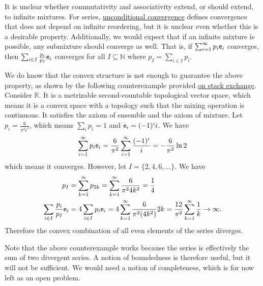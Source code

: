 It is unclear whether commutativity and associativity extend, or should extend, to infinite mixtures. For series, \href{https://en.wikipedia.org/wiki/Unconditional_convergence}{unconditional convergence} defines convergence that does not depend on infinite reordering, but it is unclear even whether this is a desirable property. Additionally, we would expect that if an infinite mixture is possible, any submixture should converge as well. That is, if $\sum_{i=1}^{\infty} p_i \mathsf{e}_i$ converges, then $\sum_{i \in I} \frac{p_i}{p_I} \mathsf{e}_i$ converges for all $I \subseteq \mathbb{N}$ where $p_I = \sum_{i \in I} p_i$.


We do know that the convex structure is not enough to guarantee the above property, as shown by the following counterexample provided \href{https://math.stackexchange.com/questions/5085283/does-a-convex-subcombination-of-a-convergent-convex-combination-converge}{on stack exchange}. Consider $\mathbb{R}$. It is a metrizable second-countable topological vector space, which means it is a convex space with a topology such that the mixing operation is continuous. It satisfies the axiom of ensemble and the axiom of mixture. Let $p_i = \frac{6}{\pi^2 i^2}$, which means $\sum_i p_i = 1$ and $\mathsf{e}_i = (-1)^i i$. We have
\begin{equation*}
	\sum_{i=1}^{\infty} p_i \mathsf{e}_i = \frac{6}{\pi^2} \sum_{i=1}^{\infty} \frac{(-1)^i}{i} = - \frac{6}{\pi^2} \ln 2
\end{equation*}
which means it converges. However, let $I = \{2,4,6,\dots\}$. We have
\begin{equation*}
	\begin{aligned}
		p_I &= \sum_{k=1}^{\infty} p_{2k} = \sum_{k=1}^{\infty} \frac{6}{\pi^2 4 k^2} = \frac{1}{4} \\
		\sum_{i \in I} \frac{p_i}{p_I} \mathsf{e}_i &= 4 \sum_{i \in I} p_i \mathsf{e}_i = 4 \sum_{k=1}^{\infty} \frac{6}{\pi^2 (4k^2)} 2k = \frac{12}{\pi^2} \sum_{k=1}^{\infty} \frac{1}{k} \to \infty.
	\end{aligned}
\end{equation*}
Therefore the convex combination of all even elements of the series diverges.

Note that the above counterexample works because the series is effectively the sum of two divergent series. A notion of boundedness is therefore useful, but it will not be sufficient. We would need a notion of completeness, which is for now left as an open problem. 

